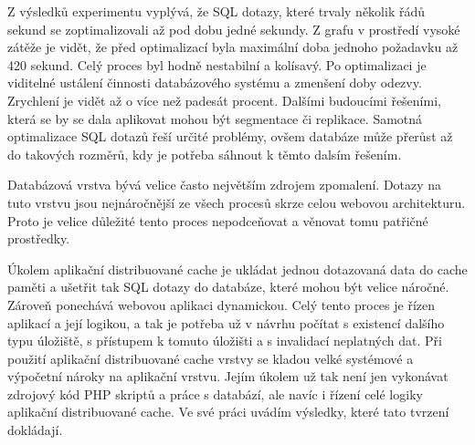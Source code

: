 \documentclass[12pt]{article}
\begin{document}
Z výsledků experimentu vyplývá, že SQL dotazy, které trvaly několik řádů sekund se zoptimalizovali až pod dobu jedné sekundy. Z grafu v prostředí vysoké zátěže je vidět, že před optimalizací byla maximální doba jednoho požadavku až 420 sekund. Celý proces byl hodně nestabilní a kolísavý. Po optimalizaci je viditelné ustálení činnosti databázového systému a zmenšení doby odezvy. Zrychlení je vidět až o více než padesát procent. Dalšími budoucími řešeními, která se by se dala aplikovat mohou být segmentace či replikace. Samotná optimalizace SQL dotazů řeší určité problémy, ovšem databáze může přerůst až do takových rozměrů, kdy je potřeba sáhnout k těmto dalsím řešením.

Databázová vrstva bývá velice často největším zdrojem zpomalení. Dotazy na tuto vrstvu jsou nejnáročnější ze všech procesů skrze celou webovou architekturu. Proto je velice důležité tento proces nepodceňovat a věnovat tomu patřičné prostředky.

\obrazek
{}

\obrazek
{}

\clearpage

\obrazek
{}


\obrazek
{}


\label{sec:memcached}
Úkolem aplikační distribuované cache je ukládat jednou dotazovaná data do cache paměti a ušetřit tak SQL dotazy do databáze, které mohou být velice náročné. Zároveň ponechává webovou aplikaci dynamickou. Celý tento proces je řízen aplikací a její logikou, a tak je potřeba už v návrhu počítat s existencí dalšího typu úložiště, s přístupem k tomuto úložišti a s invalidací neplatných dat. Při použití aplikační distribuované cache vrstvy se kladou velké systémové a výpočetní nároky na aplikační vrstvu. Jejím úkolem už tak není jen vykonávat zdrojový kód PHP skriptů a práce s databází, ale navíc i řízení celé logiky aplikační distribuované cache. Ve své práci uvádím výsledky, které tato tvrzení dokládají.
\end{document}
